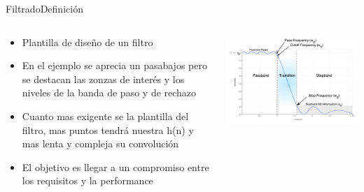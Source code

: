 \begin{frame}[t]{Filtrado}{Definición}

   \begin{columns}[t]
      \footnotesize
      \begin{column}{.4\textwidth}
         \begin{itemize}
            \item{Plantilla de diseño de un filtro}
            \item{En el ejemplo se aprecia un pasabajos pero se destacan las zonzas de interés y los niveles de la banda de paso y de rechazo}
            \item{Cuanto mas exigente se la plantilla del filtro, mas puntos tendrá nuestra h(n) y mas lenta y compleja su convolución}
            \item{El objetivo es llegar a un compromiso entre los requisitos y la performance }
         \end{itemize}
      \end{column}
      \hspace{2pt}
      \vrule
      \hspace{2pt}
      \begin{column}{.6\textwidth}
         \center\includegraphics[width=1.0\textwidth]{5_clase/pyfda3}
      \end{column}
      \hspace{2pt}
   \end{columns}
   \vfill
\end{frame}
